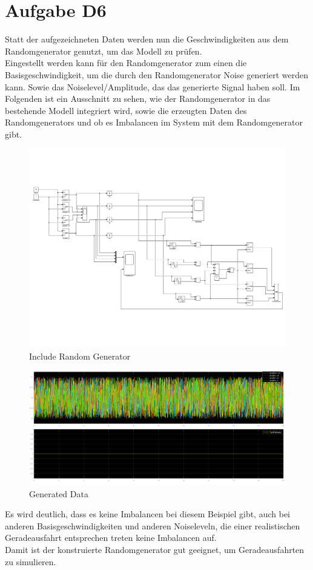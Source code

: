 
\chapter{Aufgabe D6}
Statt der aufgezeichneten Daten werden nun die Geschwindigkeiten aus dem Randomgenerator genutzt, um das Modell zu prüfen. \\
Eingestellt werden kann für den Randomgenerator zum einen die Basisgeschwindigkeit, um die durch den Randomgenerator Noise generiert werden kann. Sowie das Noiselevel/Amplitude, das das generierte Signal haben soll. Im Folgenden ist ein Ausschnitt zu sehen, wie der Randomgenerator  in das bestehende Modell integriert wird, sowie die erzeugten Daten des Randomgenerators und ob es Imbalancen im System mit dem Randomgenerator gibt.
\begin{figure}[H]
	\centering
	\includegraphics[width=0.95\linewidth]{../Graphiken/TireSimRandom}
	\caption{Include Random Generator}
	\label{fig:randomGeneratorAusschnitt}
\end{figure}
\begin{figure}[H]
	\centering
	\includegraphics[width=0.95\linewidth]{../Graphiken/RandomGeneratorData}
	\caption{Generated Data}
	\label{fig:randomgeneratordata}
\end{figure}
Es wird deutlich, dass es keine Imbalancen bei diesem Beispiel gibt, auch bei anderen Basisgeschwindigkeiten und anderen Noiseleveln, die einer realistischen Geradeausfahrt entsprechen treten keine Imbalancen auf.\\
Damit ist der konstruierte Randomgenerator gut geeignet, um Geradeausfahrten zu simulieren.\\

